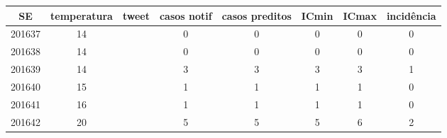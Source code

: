 \begin{tabular}{c|ccccccc}
  \hline
SE & temperatura & tweet & casos notif & casos preditos & ICmin & ICmax & incidência \\ 
  \hline
201637 & 14 &  & 0 & 0 & 0 & 0 & 0 \\ 
  201638 & 14 &  & 0 & 0 & 0 & 0 & 0 \\ 
  201639 & 14 &  & 3 & 3 & 3 & 3 & 1 \\ 
  201640 & 15 &  & 1 & 1 & 1 & 1 & 0 \\ 
  201641 & 16 &  & 1 & 1 & 1 & 1 & 0 \\ 
  201642 & 20 &  & 5 & 5 & 5 & 6 & 2 \\ 
   \hline
\end{tabular}
